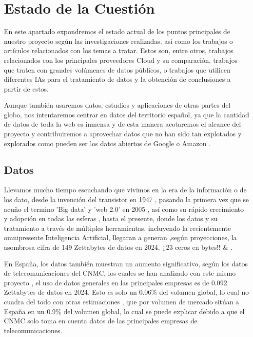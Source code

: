 \chapter{Estado de la Cuestión}
\label{cap:estadoDeLaCuestion}

En este apartado expondremos el estado actual de los puntos principales de nuestro proyecto según las investigaciones realizadas, así como los trabajos o artículos relacionados con los temas a tratar. Estos son, entre otros, trabajos relacionados con los principales proveedores Cloud y su comparación, trabajos que traten con grandes volúmenes de datos públicos, o trabajos que utilicen diferentes \ac{IA}s para el tratamiento de datos y la obtención de conclusiones a partir de estos. 

Aunque también usaremos datos, estudios y aplicaciones de otras partes del globo, nos intentaremos centrar en datos del territorio español, ya que la cantidad de datos de toda la web es inmensa y de esta manera acotaremos el alcance del proyecto y contribuiremos a aprovechar datos que no han sido tan explotados y explorados como pueden ser los datos abiertos de Google \citep{googleDataCommon} o Amazon \citep{AWSDataCommon} . 

\section{Datos}

Llevamos mucho tiempo escuchando que vivimos en la era de la información o de los dato, desde la invención del transistor en 1947 \citep{wikiInformationAge}, pasando la primera vez que se acuño el termino 'Big data' y 'web 2.0' en 2005 \citep{HistoryOfBigData}, así como su rápido crecimiento y adopción en todas las esferas \citep{brown2011you}, hasta el presente, donde los datos y su tratamiento a través de múltiples herramientas, incluyendo la recientemente omnipresente Inteligencia Artificial, llegaran a generan ,según proyecciones, la asombrosa cifra de 149 Zettabytes de datos en 2024, ¡¡23 ceros en bytes!! \citep{BigDataStatista} \& \citep{BigDataStadisticsMarket}.

En España, los datos también muestran un aumento significativo, según los datos de telecomunicaciones del CNMC, los cuales se han analizado con este mismo proyecto \citep{DatosGeneralesCNMC}, el uso de datos generales en las principales empresas es de 0.092 Zettabytes de datos en 2024.
Esto es solo un 0.06\% del volumen global, lo cual no cuadra del todo con otras estimaciones \citep{DatosMercadosEspanna}, que por volumen de mercado sitúan a España en un 0.9\% del volumen global, lo cual se puede explicar debido a que el CNMC solo toma en cuenta datos de las principales empresas de telecomunicaciones. 

